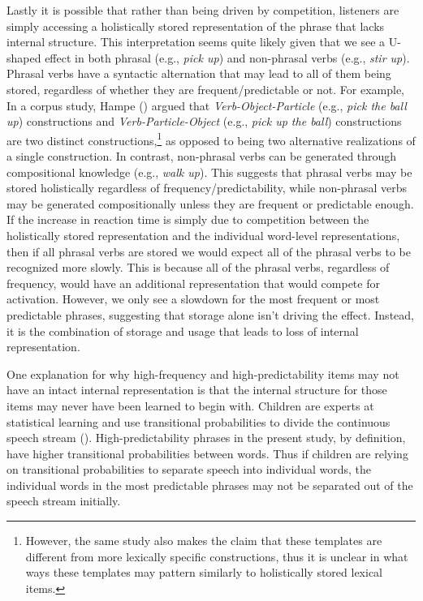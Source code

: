 \documentclass[
  12pt,
  letterpaper,
]{scrreport}
\begin{document}
Lastly it is possible that rather than being driven by competition,
listeners are simply accessing a holistically stored representation of
the phrase that lacks internal structure. This interpretation seems
quite likely given that we see a U-shaped effect in both phrasal (e.g.,
\emph{pick up}) and non-phrasal verbs (e.g., \emph{stir up}). Phrasal
verbs have a syntactic alternation that may lead to all of them being
stored, regardless of whether they are frequent/predictable or not. For
example, In a corpus study, Hampe
() argued that
\emph{Verb-Object-Particle} (e.g., \emph{pick the ball up})
constructions and \emph{Verb-Particle-Object} (e.g., \emph{pick up the
ball}) constructions are two distinct constructions,\footnote{However,
  the same study also makes the claim that these templates are different
  from more lexically specific constructions, thus it is unclear in what
  ways these templates may pattern similarly to holistically stored
  lexical items.} as opposed to being two alternative realizations of a
single construction. In contrast, non-phrasal verbs can be generated
through compositional knowledge (e.g., \emph{walk up}). This suggests
that phrasal verbs may be stored holistically regardless of
frequency/predictability, while non-phrasal verbs may be generated
compositionally unless they are frequent or predictable enough. If the
increase in reaction time is simply due to competition between the
holistically stored representation and the individual word-level
representations, then if all phrasal verbs are stored we would expect
all of the phrasal verbs to be recognized more slowly. This is because
all of the phrasal verbs, regardless of frequency, would have an
additional representation that would compete for activation. However, we
only see a slowdown for the most frequent or most predictable phrases,
suggesting that storage alone isn't driving the effect. Instead, it is
the combination of storage and usage that leads to loss of internal
representation.

One explanation for why high-frequency and high-predictability items may
not have an intact internal representation is that the internal
structure for those items may never have been learned to begin with.
Children are experts at statistical learning and use transitional
probabilities to divide the continuous speech stream
(). High-predictability phrases in the present study, by definition,
have higher transitional probabilities between words. Thus if children
are relying on transitional probabilities to separate speech into
individual words, the individual words in the most predictable phrases
may not be separated out of the speech stream initially.
\end{document}
